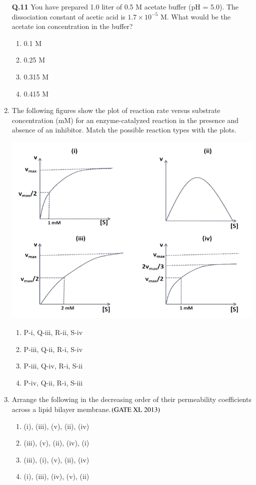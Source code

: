 \documentclass[journal]{IEEEtran}
\begin{document}
\begin{enumerate}
\textbf{Q.11} You have prepared 1.0 liter of 0.5 M acetate buffer (pH = 5.0). The dissociation constant of acetic acid is $1.7 \times 10^{-5}$ M. What would be the acetate ion concentration in the buffer?\hfill  \textit{}
\begin{enumerate}
    \item 0.1 M
    \item 0.25 M
    \item 0.315 M
    \item 0.415 M
\end{enumerate}

\item The following figures show the plot of reaction rate versus substrate concentration (mM) for an enzyme-catalyzed reaction in the presence and absence of an inhibitor. Match the possible reaction types with the plots.\hfill  \textit{}
\begin{center}
    \includegraphics[width=0.5\columnwidth]{figs/Screenshot 2025-08-05 123225.png}
\end{center}
\begin{enumerate}
    \item P-i, Q-iii, R-ii, S-iv
    \item P-iii, Q-ii, R-i, S-iv
    \item P-iii, Q-iv, R-i, S-ii
    \item P-iv, Q-ii, R-i, S-iii
\end{enumerate}

\item Arrange the following in the decreasing order of their permeability coefficients across a lipid bilayer membrane.\hfill $\left(\text{GATE XL 2013}\right)$
\begin{enumerate}
    \item (i), (iii), (v), (ii), (iv)
    \item (iii), (v), (ii), (iv), (i)
    \item (iii), (i), (v), (ii), (iv)
    \item (i), (iii), (iv), (v), (ii)
\end{enumerate}


\end{enumerate}
\end{document}
